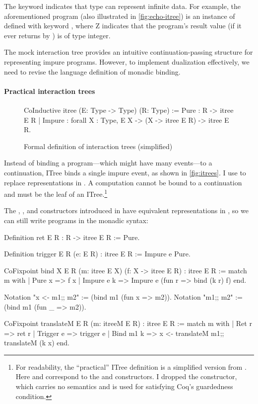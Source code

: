 The  keyword indicates that type  can represent
infinite data.  For example, the aforementioned  program (also
illustrated in \autoref{fig:echo-itree}) is an instance of  defined with keyword , where \ilc Z indicates that the
program's result value (if it ever returns by ) is of type integer.

The mock interaction tree provides an intuitive continuation-passing structure
for representing impure programs.  However, to implement dualization
effectively, we need to revise the language definition of monadic binding.

\paragraph{Practical interaction trees}

\begin{figure}
\begin{coq}
  CoInductive itree (E: Type -> Type) (R: Type) :=
    Pure   : R -> itree E R
  | Impure : forall {X : Type}, E X -> (X -> itree E R) -> itree E R.
\end{coq}
\caption{Formal definition of interaction trees (simplified)}
\label{fig:itrees}
\end{figure}

Instead of binding a program---which might have many events---to a continuation,
ITree binds a single impure event, as shown in \autoref{fig:itrees}.  I
use  to replace  representations
in .  A  computation cannot be bound to a continuation and
must be the leaf of an ITree.\footnote{For readability, the ``practical'' ITree
definition is a simplified version from \citet{itree}.  Here 
and  correspond to the  and  constructors.  I
dropped the  constructor, which carries no
semantics and is used for satisfying Coq's guardedness condition.}

The , , and  constructors introduced in
 have equivalent representations in , so we can still
write programs in the monadic syntax:
\begin{coq}
  Definition ret {E R} : R -> itree E R := Pure.
  
  Definition trigger {E R} (e: E R) : itree E R := Impure e Pure.

  CoFixpoint bind {X E R} (m: itree E X) (f: X -> itree E R) : itree E R :=
    match m with
    | Pure   x   => f x
    | Impure e k => Impure e (fun r => bind (k r) f)
    end.

  Notation "x <- m1;; m2" := (bind m1 (fun x => m2)).
  Notation "m1;; m2"      := (bind m1 (fun _ => m2)).

  CoFixpoint translateM {E R} (m: itreeM E R) : itree E R :=
    match m with
    | Ret     r => ret r
    | Trigger e => trigger e
    | Bind m1 k => x <- translateM m1;; translateM (k x)
    end.
\end{coq}
\vspace*{1em}


